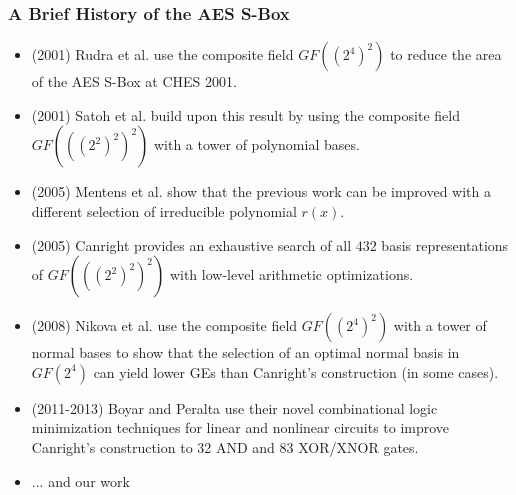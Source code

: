 \documentclass[handout,10pt]{beamer}
\begin{document}
\begin{frame}
	\frametitle{A Brief History of the AES S-Box}
	\begin{itemize}
		\item (2001) Rudra et al. use the composite field $GF((2^4)^2)$ to reduce the area of the AES S-Box at CHES 2001.
		\pause
		\item (2001) Satoh et al. build upon this result by using the composite field $GF(((2^2)^2)^2)$ with a tower of polynomial bases.
		\pause
		\item(2005) Mentens et al. show that the previous work can be improved with a different selection of irreducible polynomial $r(x)$.
		\pause
		\item (2005) Canright provides an exhaustive search of all $432$ basis representations of $GF(((2^2)^2)^2)$ with low-level arithmetic optimizations.
		\pause
		\item (2008) Nikova et al. use the composite field $GF((2^4)^2)$ with a tower of normal bases to show that the selection of an optimal normal basis in $GF(2^4)$ can yield lower GEs than Canright's construction (in some cases).
		\pause
		\item (2011-2013) Boyar and Peralta use their novel combinational logic minimization techniques for linear and nonlinear circuits to improve Canright's construction to 32 AND and 83 XOR/XNOR gates.
		\item ... and our work
	\end{itemize}
\end{frame}
\end{document}
